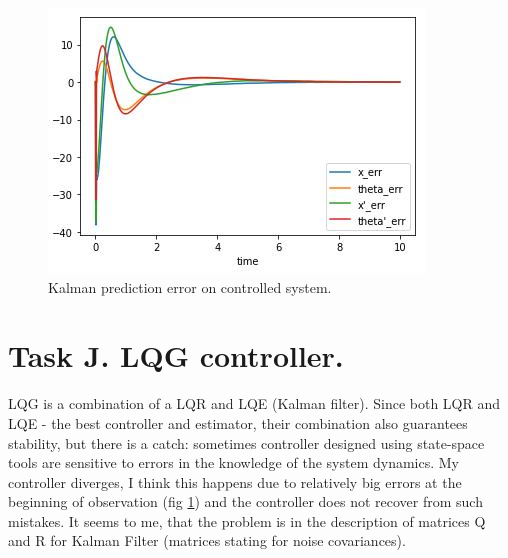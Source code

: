 \documentclass[12pt,letterpaper]{article}
\begin{document}
    \begin{figure}[htb]
        \centering
        \includegraphics[width=0.5\linewidth]{images/filter/kalman_prediction_error.jpg}
        \caption{Kalman prediction error on controlled system.}
        \label{fig:kalman_prediction_error}
    \end{figure}
    
\section*{Task J. LQG controller.}
\label{Q:J}
    LQG is a combination of a LQR and LQE (Kalman filter). Since both LQR and LQE - the best controller and estimator, their combination also guarantees stability, but there is a catch: sometimes controller designed using state-space tools are sensitive to errors in the knowledge of the system dynamics. My controller diverges, I think this happens due to relatively big errors at the beginning of observation (fig \ref{fig:kalman_prediction_error}) and the controller does not recover from such mistakes. It seems to me, that the problem is in the description of matrices Q and R for Kalman Filter (matrices stating for noise covariances).
\end{document}
